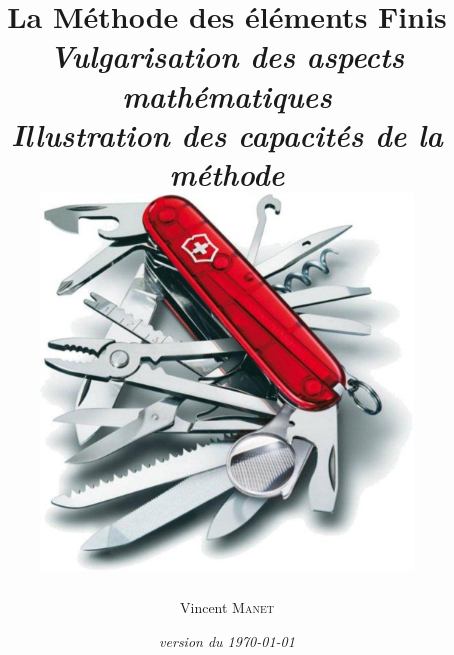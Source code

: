 \documentclass[11pt,pdflatex]{book}
\date{\emph{version du \today}}
\begin{document}
\ifVersionDuDocEstVincent
%
\title{\textbf{La Méthode des éléments Finis}\\[+5mm]
   \emph{ Vulgarisation des aspects mathématiques}\\
   \emph{ Illustration des capacités de la méthode}\\[+5mm]
   \includegraphics[height=100mm]{couteau-suisse}}
   \author{Vincent \textsc{Manet}}%
   \maketitle
\else
   \thispagestyle{empty}\mbox{}%
\end{document}
